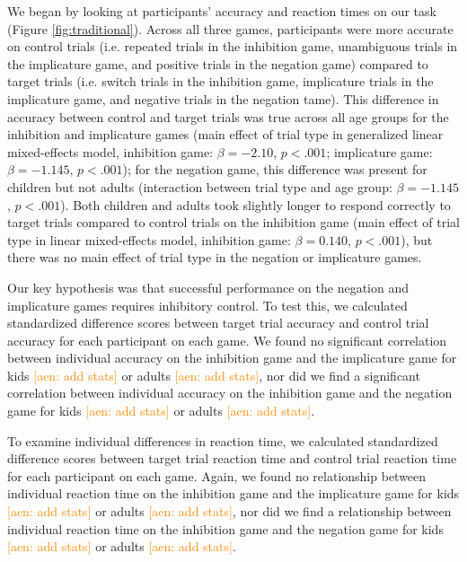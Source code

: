 \documentclass[10pt,letterpaper]{article}
\newcommand{\aen}[1]{\textcolor{DarkOrange}{[aen: #1]}}
\begin{document}
We began by looking at participants' accuracy and reaction times on our task (Figure \ref{fig:traditional}).  Across all three games, participants were more accurate on control trials (i.e. repeated trials in the inhibition game, unambiguous trials in the implicature game, and positive trials in the negation game) compared to target trials (i.e. switch trials in the inhibition game, implicature trials in the implicature game, and negative trials in the negation tame).  This difference in accuracy between control and target trials was true across all age groups for the inhibition and implicature games (main effect of trial type in generalized linear mixed-effects model, inhibition game: $\beta = -2.10$, $p< .001$; implicature game: $\beta = -1.145$, $p< .001$); for the negation game, this difference was present for children but not adults (interaction between trial type and age group: $\beta = -1.145$, $p< .001$).  Both children and adults took slightly longer to respond correctly to target trials compared to control trials on the inhibition game (main effect of trial type in linear mixed-effects model, inhibition game: $\beta = 0.140$, $p< .001$), but there was no main effect of trial type in the negation or implicature games.  

Our key hypothesis was that successful performance on the negation and implicature games requires inhibitory control.  To test this, we calculated standardized difference scores between target trial accuracy and control trial accuracy for each participant on each game.  We found no significant correlation between individual accuracy on the inhibition game and the implicature game for kids \aen{add stats} or adults \aen{add stats}, nor did we find a significant correlation between individual accuracy on the inhibition game and the negation game for kids \aen{add stats} or adults \aen{add stats}.  

To examine individual differences in reaction time, we calculated standardized difference scores between target trial reaction time and control trial reaction time for each participant on each game.  Again, we found no relationship between individual reaction time on the inhibition game and the implicature game for kids \aen{add stats} or adults \aen{add stats}, nor did we find a relationship between individual reaction time on the inhibition game and the negation game for kids \aen{add stats} or adults \aen{add stats}.  
\end{document}

